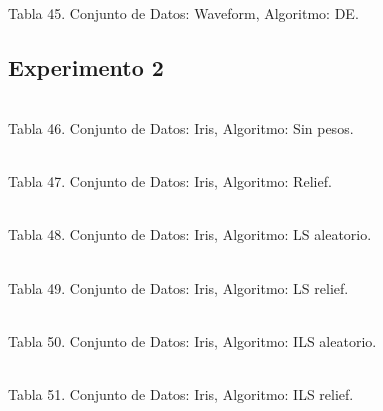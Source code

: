 \documentclass{ci5652}
\begin{document}
%
\\
Tabla 45. Conjunto de Datos: Waveform, Algoritmo: DE.

\subsection*{Experimento 2}

\begin{adjustbox}{width=\columnwidth, center=\columnwidth}
%
\\
\end{adjustbox}
Tabla 46. Conjunto de Datos: Iris, Algoritmo: Sin pesos.

\begin{adjustbox}{width=\columnwidth, center=\columnwidth}
%
\\
\end{adjustbox}
Tabla 47. Conjunto de Datos: Iris, Algoritmo: Relief.

\begin{adjustbox}{width=\columnwidth, center=\columnwidth}
%
\\
\end{adjustbox}
Tabla 48. Conjunto de Datos: Iris, Algoritmo: LS aleatorio.

\begin{adjustbox}{width=\columnwidth, center=\columnwidth}
%
\\
\end{adjustbox}
Tabla 49. Conjunto de Datos: Iris, Algoritmo: LS relief.

\begin{adjustbox}{width=\columnwidth, center=\columnwidth}
%
\\
\end{adjustbox}
Tabla 50. Conjunto de Datos: Iris, Algoritmo: ILS aleatorio.

\begin{adjustbox}{width=\columnwidth, center=\columnwidth}
%
\\
\end{adjustbox}
Tabla 51. Conjunto de Datos: Iris, Algoritmo: ILS relief.
\end{document}
